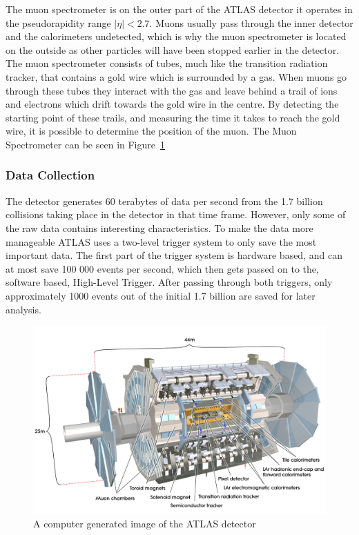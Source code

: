 \documentclass[12pt,a4paper]{article}
\numberwithin{equation}{section}
\begin{document}
The muon spectrometer is on the outer part of the ATLAS detector it operates in
the pseudorapidity range $|\eta| < 2.7$. Muons usually pass through the inner
detector and the calorimeters undetected, which is why the muon spectrometer is
located on the outside as other particles will have been stopped earlier in the
detector. The muon spectrometer consists of tubes, much like the transition
radiation tracker, that contains a gold wire which is surrounded by a gas. When
muons go through these tubes they interact with the gas and leave behind a trail
of ions and electrons which drift towards the gold wire in the centre. By
detecting the starting point of these trails, and measuring the time it takes to
reach the gold wire, it is possible to determine the position of the muon. The Muon Spectrometer can be seen in Figure~\ref{fig:detector} \cite{ATLAS-Muon}


\subsubsection{Data Collection}
The detector generates 60 terabytes of data per second from the 1.7 billion
collisions taking place in the detector in that time frame. However, only some
of the raw data contains interesting characteristics. To make the data more %
manageable ATLAS uses a two-level trigger system to only save the most important
data. The first part of the trigger system is hardware based, and can at most
save 100 000 events per second, which then gets passed on to the, software
based, High-Level Trigger. After passing through both triggers, only
approximately 1000 events out of the initial 1.7 billion are saved for later
analysis. \cite{ATLAS-trig}

\begin{figure}[H]
	\centering
	\includegraphics[scale=0.1]{figures/atlas.jpg}
	\caption{A computer generated image of the ATLAS detector~\cite{detector}}\label{fig:detector}
\end{figure}
\end{document}

